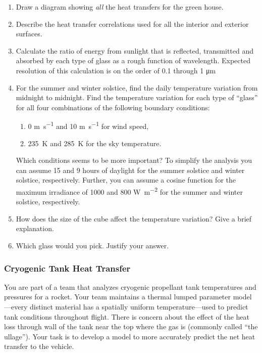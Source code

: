 \documentclass[12pt,letterpaper]{article}
\begin{document}
\begin{enumerate}
    \item Draw a diagram showing \textit{all} the heat transfers for the green house.

    \item Describe the heat transfer correlations used for all the interior and exterior surfaces.

    \item Calculate the ratio of energy from sunlight that is reflected, transmitted and absorbed by each type of glass as a rough function of wavelength.
        Expected resolution of this calculation is on the order of 0.1 through 1 \si{\micro\meter}
    
    \item For the summer and winter solstice, find the daily temperature variation from midnight to midnight.
        Find the temperature variation for each type of ``glass'' for all four combinations of the following boundary conditions:
        \begin{enumerate}
            \item 0 \si{\meter\per\second} and 10 \si{\meter\per\second} for wind speed,
            \item \SI{235}{\kelvin} and \SI{285}{\kelvin} for the sky temperature.
        \end{enumerate}
        Which conditions seems to be more important?
        To simplify the analysis you can assume 15 and 9 hours of daylight for the summer solstice and winter solstice, respectively.
        Further, you can assume a cosine function for the maximum irradiance of 1000 and 800 \si{\watt\per\square\meter} for the summer and winter solstice, respectively.
    
        \item How does the size of the cube affect the temperature variation?
            Give a brief explanation.
        
        \item Which glass would you pick.
            Justify your answer.
\end{enumerate}


\subsubsection*{Cryogenic Tank Heat Transfer}

You are part of a team that analyzes cryogenic propellant tank temperatures and pressures for a rocket.
Your team maintains a thermal lumped parameter model---every distinct material has a spatially uniform temperature---used to predict tank conditions throughout flight.
There is concern about the effect of the heat loss through wall of the tank near the top where the gas is (commonly called ``the ullage'').
Your task is to develop a model to more accurately predict the net heat transfer to the vehicle.
\end{document}
